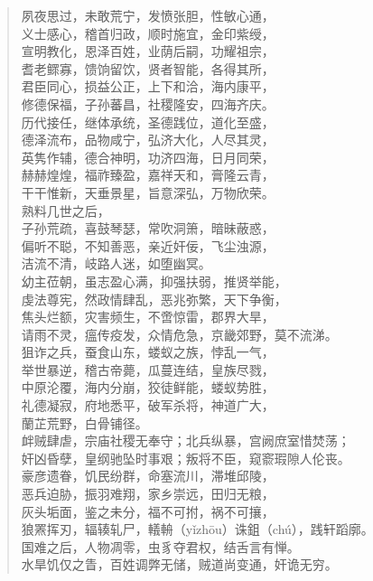 \documentclass[12pt,oneside]{book}
\newenvironment{shici}{%
\begin{verse}%
\centering\large\hspace{12pt}}%
{\end{verse}}
\begin{document}
\begin{shici}
夙夜思过，未敢荒宁，发愤张胆，性敏心通，\\
义士感心，稽首归政，顺时施宜，金印紫绶，\\
宣明教化，恩泽百姓，业荫后嗣，功耀祖宗，\\
耆老鳏寡，馈饷留饮，贤者智能，各得其所，\\
君臣同心，损益公正，上下和洽，海内康平，\\
修德保福，子孙蕃昌，社稷隆安，四海齐庆。\\
历代接任，继体承统，圣德践位，道化至盛，\\
德泽流布，品物咸宁，弘济大化，人尽其灵，\\
英隽作辅，德合神明，功济四海，日月同荣，\\
赫赫煌煌，福祚臻盈，嘉祥天和，膏隆云青，\\
干干惟新，天垂景星，旨意深弘，万物欣荣。\\
熟料几世之后，\\
子孙荒疏，喜鼓琴瑟，常吹洞箫，暗昧蔽惑，\\
偏听不聪，不知善恶，亲近奸佞，飞尘浊源，\\
洁流不清，岐路人迷，如堕幽冥。\\
幼主莅朝，虽志盈心满，抑强扶弱，推贤举能，\\
虔法尊宪，然政情肆乱，恶兆弥繁，天下争衡，\\
焦头烂额，灾害频生，不啻惊雷，郡界大旱，\\
请雨不灵，瘟传疫发，众情危急，京畿郊野，莫不流涕。\\
狙诈之兵，蚕食山东，蝼蚁之族，悖乱一气，\\
举世暴逆，稽古帝薨，瓜蔓连结，皇族尽戮，\\
中原沦覆，海内分崩，狡徒鲜能，蝼蚁势胜，\\
礼德凝寂，府地悉平，破军杀将，神道广大，\\
蘭芷荒野，白骨铺径。\\
衅贼肆虐，宗庙社稷无奉守；北兵纵暴，宫阙庶室惜焚荡；\\
奸凶昏孽，皇纲驰坠时事艰；叛将不臣，窥窬瑕隙人伦丧。\\
豪彦遗眷，饥民纷群，命塞流川，滞堆邱陵，\\
恶兵迫胁，振羽难翔，家乡崇远，田归无粮，\\
灰头垢面，鉴之未分，福不可拊，祸不可攘，\\
狼罴挥刃，辐辏轧尸，轙輈（yǐzhōu）诛鉏（chú），践轩蹈廓。\\
国难之后，人物凋零，虫豸夺君权，结舌言有惮。\\
水旱饥仅之眚，百姓调弊无储，贼道尚变通，奸诡无穷。\\

\end{shici}
\end{document}

